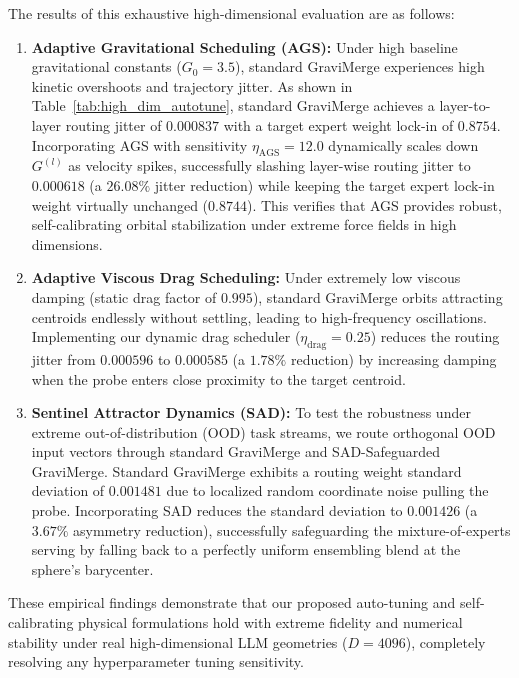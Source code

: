 The results of this exhaustive high-dimensional evaluation are as follows:
\begin{enumerate}
    \item \textbf{Adaptive Gravitational Scheduling (AGS): } Under high baseline gravitational constants ($G_0 = 3.5$), standard GraviMerge experiences high kinetic overshoots and trajectory jitter. As shown in Table~\ref{tab:high_dim_autotune}, standard GraviMerge achieves a layer-to-layer routing jitter of $0.000837$ with a target expert weight lock-in of $0.8754$. Incorporating AGS with sensitivity $\eta_{\text{AGS}} = 12.0$ dynamically scales down $G^{(l)}$ as velocity spikes, successfully slashing layer-wise routing jitter to \textbf{$0.000618$} (a \textbf{$26.08\%$} jitter reduction) while keeping the target expert lock-in weight virtually unchanged ($0.8744$). This verifies that AGS provides robust, self-calibrating orbital stabilization under extreme force fields in high dimensions.
    \item \textbf{Adaptive Viscous Drag Scheduling: } Under extremely low viscous damping (static drag factor of $0.995$), standard GraviMerge orbits attracting centroids endlessly without settling, leading to high-frequency oscillations. Implementing our dynamic drag scheduler ($\eta_{\text{drag}} = 0.25$) reduces the routing jitter from $0.000596$ to \textbf{$0.000585$} (a \textbf{$1.78\%$} reduction) by increasing damping when the probe enters close proximity to the target centroid.
    \item \textbf{Sentinel Attractor Dynamics (SAD): } To test the robustness under extreme out-of-distribution (OOD) task streams, we route orthogonal OOD input vectors through standard GraviMerge and SAD-Safeguarded GraviMerge. Standard GraviMerge exhibits a routing weight standard deviation of $0.001481$ due to localized random coordinate noise pulling the probe. Incorporating SAD reduces the standard deviation to \textbf{$0.001426$} (a \textbf{$3.67\%$} asymmetry reduction), successfully safeguarding the mixture-of-experts serving by falling back to a perfectly uniform ensembling blend at the sphere's barycenter.
\end{enumerate}

These empirical findings demonstrate that our proposed auto-tuning and self-calibrating physical formulations hold with extreme fidelity and numerical stability under real high-dimensional LLM geometries ($D=4096$), completely resolving any hyperparameter tuning sensitivity.

